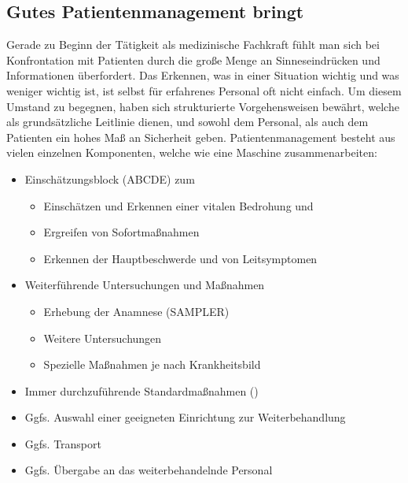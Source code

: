 \subsection{Gutes Patientenmanagement bringt } 
Gerade zu Beginn der Tätigkeit als medizinische
Fachkraft fühlt man sich bei Konfrontation mit Patienten durch die
große Menge an Sinneseindrücken und Informationen überfordert. 
Das Erkennen, was in einer Situation wichtig und was weniger
wichtig ist, ist selbst für erfahrenes Personal oft nicht einfach.
Um diesem Umstand zu begegnen, haben sich strukturierte
Vorgehensweisen bewährt, welche als grundsätzliche Leitlinie
dienen, und sowohl dem Personal, als auch dem Patienten ein
hohes Maß an Sicherheit geben.
Patientenmanagement besteht aus vielen einzelnen
Komponenten, welche wie eine Maschine zusammenarbeiten:
\begin{itemize}
  \item Einschätzungsblock (ABCDE) zum
  \begin{itemize}
    \item Einschätzen und
    Erkennen einer vitalen Bedrohung und
    \item Ergreifen von Sofortmaßnahmen
    \item Erkennen der Hauptbeschwerde und von Leitsymptomen
  \end{itemize}
  \item Weiterführende Untersuchungen und Maßnahmen
  \begin{itemize}
    \item Erhebung der Anamnese (SAMPLER)
    \item Weitere Untersuchungen
    \item Spezielle Maßnahmen je nach Krankheitsbild
  \end{itemize}
  \item Immer durchzuführende Standardmaßnahmen
  ()
  \item Ggfs. Auswahl einer geeigneten Einrichtung zur
  Weiterbehandlung
  \item Ggfs. Transport
  \item Ggfs. Übergabe an das weiterbehandelnde Personal
\end{itemize}




